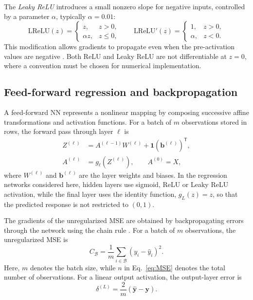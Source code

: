 \documentclass[aps,rmp,reprint,amsmath,amssymb,graphicx,longbibliography]{revtex4-1}
\begin{document}
The \textit{Leaky ReLU} introduces a small nonzero slope for negative
inputs, controlled by a parameter $\alpha$, typically $\alpha=0.01$:
\begin{equation}
    \mathrm{LReLU}(z)=
    \begin{cases}
        z, & z>0,\\
        \alpha z, & z\leq 0,
    \end{cases}
    \qquad
    \mathrm{LReLU}'(z)=
    \begin{cases}
        1, & z>0,\\
        \alpha, & z<0.
    \end{cases}
\end{equation}
This modification allows gradients to propagate even when the
pre-activation values are negative \cite{Book_Ch8}. Both ReLU and Leaky ReLU are
not differentiable at $z=0$, where a convention must be chosen
for numerical implementation.


\subsection{Feed-forward regression and backpropagation}
\label{subsec:ffnn_backprop}

A feed-forward NN represents a nonlinear mapping by composing
successive affine transformations and activation functions. For a batch of
$m$ observations stored in rows, the forward pass through layer $\ell$ is
\begin{align}
 Z^{(\ell)} &= A^{(\ell-1)}W^{(\ell)}
                 +\mathbf{1}(\mathbf{b}^{(\ell)})^{\mathsf T},\\
 A^{(\ell)} &= g_{\ell}\!\left(Z^{(\ell)}\right),
 \qquad A^{(0)}=X,
\end{align}
where $W^{(\ell)}$ and $\mathbf{b}^{(\ell)}$ are the layer weights and
biases. In the regression networks considered here, hidden layers use
sigmoid, ReLU or Leaky ReLU activation, while the final layer uses the identity function,
$g_L(z)=z$, so that the predicted response is not restricted to $(0,1)$.

The gradients of the unregularized MSE are obtained by backpropagating
errors through the network using the chain rule \cite{Book_Ch8}. 
For a batch of $m$ observations, the unregularized MSE is
\begin{equation}
    C_{\mathcal{B}} =
    \frac{1}{m}\sum_{i \in \mathcal{B}}
    (y_i-\hat{y}_i)^2.
\end{equation}
Here, $m$ denotes the batch size, while $n$ in Eq.~\eqref{eq:MSE}
denotes the total number of observations. For a linear output activation,
the output-layer error is
\begin{equation}
    \delta^{(L)}
    = \frac{2}{m}(\hat{\mathbf{y}}-\mathbf{y}).
\end{equation}
\end{document}
